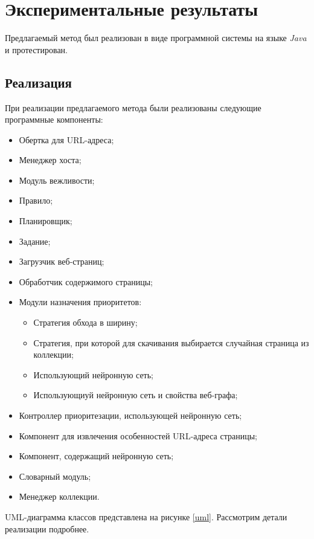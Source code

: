 \chapter{Экспериментальные результаты}
\label{chapter_experiment}

Предлагаемый метод был реализован в виде программной системы на языке \textit{Java} и протестирован.

\section{Реализация}

При реализации предлагаемого метода были реализованы следующие программные компоненты:
\begin{itemize}
\item Обертка для URL-адреса;
\item Менеджер хоста;
\item Модуль вежливости;
\item Правило;
\item Планировщик;
\item Задание;
\item Загрузчик веб-страниц;
\item Обработчик содержимого страницы;
\item Модули назначения приоритетов:
\begin{itemize}
\item Стратегия обхода в ширину;
\item Стратегия, при которой для скачивания выбирается случайная страница из коллекции;
\item Использующий нейронную сеть;
\item Использующиуй нейронную сеть и свойства веб-графа;
\end{itemize}
\item Контроллер приоритезации, использующей нейронную сеть;
\item Компонент для извлечения особенностей URL-адреса страницы;
\item Компонент, содержащий нейронную сеть;
\item Словарный модуль;
\item Менеджер коллекции.
\end{itemize}

UML-диаграмма классов представлена на рисунке \ref{uml}. Рассмотрим детали реализации подробнее.

